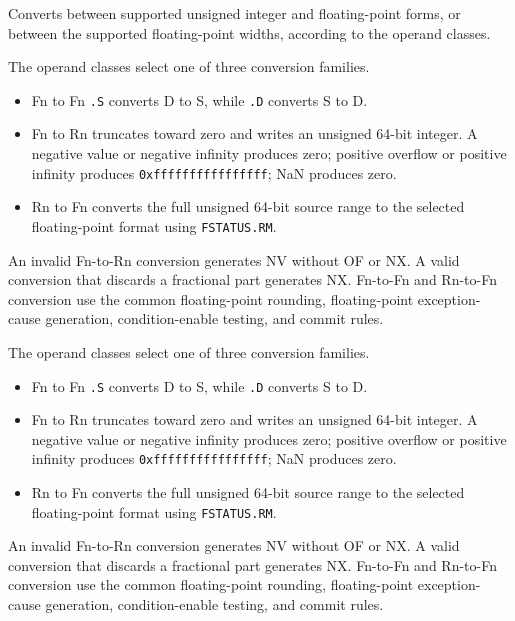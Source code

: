 Converts between supported unsigned integer and floating-point forms, or between the supported floating-point widths, according to the operand classes.

The operand classes select one of three conversion families.

\begin{itemize}
\item Fn to Fn \texttt{.S} converts D to S, while \texttt{.D} converts S to D.
\item Fn to Rn truncates toward zero and writes an unsigned 64-bit integer. A negative value or negative infinity
produces zero; positive overflow or positive infinity produces \texttt{0xffffffffffffffff}; NaN produces zero.
\item Rn to Fn converts the full unsigned 64-bit source range to the selected floating-point format using
\texttt{FSTATUS.RM}.
\end{itemize}
An invalid Fn-to-Rn conversion generates NV without OF or NX. A valid conversion that discards a fractional part
generates NX. Fn-to-Fn and Rn-to-Fn conversion use the common floating-point rounding, floating-point
exception-cause generation, condition-enable testing, and commit rules.

The operand classes select one of three conversion families.

\begin{itemize}
\item Fn to Fn \texttt{.S} converts D to S, while \texttt{.D} converts S to D.
\item Fn to Rn truncates toward zero and writes an unsigned 64-bit integer. A negative value or negative infinity
produces zero; positive overflow or positive infinity produces \texttt{0xffffffffffffffff}; NaN produces zero.
\item Rn to Fn converts the full unsigned 64-bit source range to the selected floating-point format using
\texttt{FSTATUS.RM}.
\end{itemize}
An invalid Fn-to-Rn conversion generates NV without OF or NX. A valid conversion that discards a fractional part
generates NX. Fn-to-Fn and Rn-to-Fn conversion use the common floating-point rounding, floating-point
exception-cause generation, condition-enable testing, and commit rules.
